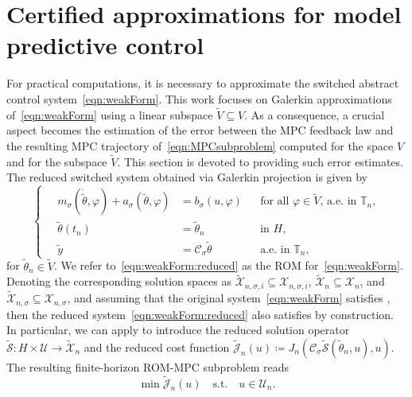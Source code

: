 \documentclass[reqno]{amsart}
\newcommand{\X}{{\mathscr X}}
\newcommand{\U}{{\mathscr U}}
\newcommand{\timeInt}{\mathbb{T}}
\newcommand{\state}{\theta}
\newcommand{\inpVar}{u}
\newcommand{\outVar}{y}
\newcommand{\cOper}{\calC}
\newcommand{\intermediateInitStateRed}{\stateRed_n}
\newcommand{\switch}{\sigma}
\newcommand{\reduce}[1]{\tilde{#1}}
\newcommand{\Vred}{\reduce{V}}
\newcommand{\Xred}{\reduce{\X}}
\newcommand{\stateRed}{\reduce{\state}}
\newcommand{\outVarRed}{\reduce{\outVar}}
\newcommand{\Jhat}{\calJ}
\newcommand{\calC}{\mathcal{C}}
\newcommand{\calJ}{\mathcal{J}}
\newcommand{\calS}{\mathcal{S}}
\newcommand{\abbr}[1]{\textsf{#1}\xspace}
\newcommand{\ROM}{\abbr{ROM}}
\newcommand{\MPC}{\abbr{MPC}}
\begin{document}
\section{Certified approximations for model predictive control}
\label{sec:approximation}
For practical computations, it is necessary to approximate the switched abstract control system~\eqref{eqn:weakForm}. This work focuses on Galerkin approximations of~\eqref{eqn:weakForm} using a linear subspace $\Vred \subseteq V$. As a consequence, a crucial aspect becomes the estimation of the error between the \MPC feedback law and the resulting \MPC trajectory of~\eqref{eqn:MPCsubproblem} computed for the space $V$ and for the subspace $\Vred$. This section is devoted to providing such error estimates. 
%
The reduced switched system obtained via Galerkin projection is given by
%
\begin{equation}
	\label{eqn:weakForm:reduced}
    \left\{\quad
    \begin{aligned}
        m_{\switch}(\dot{\stateRed},\varphi) + a_{\switch}(\stateRed,\varphi) &= b_{\switch}(\inpVar,\varphi) && \text{for all $\varphi\in \Vred$, a.e. in $\timeInt_n$},\\
       \stateRed(t_n) &= \stateRed_n && \text{in }H, \\
       \outVarRed &= \cOper_{\switch}\stateRed && \text{a.e. in $\timeInt_n$}, 
    \end{aligned}\right.
\end{equation}
%
for $\intermediateInitStateRed\in \Vred$. We refer to~\eqref{eqn:weakForm:reduced} as the \ROM for~\eqref{eqn:weakForm}. Denoting the corresponding solution spaces as $\Xred_{n,\switch,i} \subseteq\X_{n,\switch,i}$, $\Xred_n \subseteq\X_n$, and $\Xred_{n,\switch} \subseteq\X_{n,\switch}$, and assuming that the original system~\eqref{eqn:weakForm} satisfies , then the reduced system~\eqref{eqn:weakForm:reduced} also satisfies  by construction. In particular, we can apply  to introduce the reduced solution operator $\reduce{\calS}\colon H\times \U\to \Xred_n$ and the reduced cost function $\reduce{\Jhat}_n(\inpVar)\coloneqq J_n(\cOper_\switch\reduce{\calS}(\intermediateInitStateRed,\inpVar),\inpVar)$. The resulting finite-horizon \ROM-\MPC subproblem reads
%
\begin{equation}
	\label{eqn:MPCsubproblem:red}
	\min \reduce{\Jhat}_n(\inpVar)\quad\text{s.t.}\quad u\in \U_n.
\end{equation}
\end{document}
